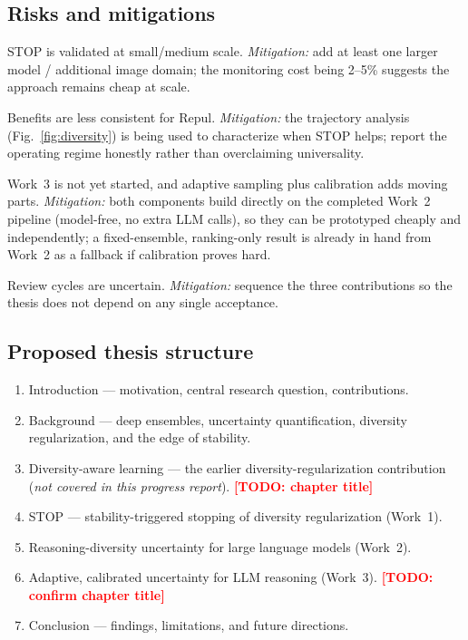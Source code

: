 \documentclass[11pt]{article}
\newcommand{\TODO}[1]{\textcolor{red}{\textbf{[TODO: #1]}}}
\begin{document}
\subsection{Risks and mitigations}
\begin{description}[leftmargin=2.4em, style=nextline, itemsep=3pt]
  \item[Scaling risk] STOP is validated at small/medium scale. \emph{Mitigation:} add at least one
  larger model / additional image domain; the monitoring cost being 2--5\% suggests the approach
  remains cheap at scale.
  \item[Regularizer-dependence risk] Benefits are less consistent for Repul. \emph{Mitigation:}
  the trajectory analysis (Fig.~\ref{fig:diversity}) is being used to characterize when STOP helps;
  report the operating regime honestly rather than overclaiming universality.
  \item[Work~3 feasibility] Work~3 is not yet started, and adaptive sampling plus calibration adds
  moving parts. \emph{Mitigation:} both components build directly on the completed Work~2 pipeline
  (model-free, no extra LLM calls), so they can be prototyped cheaply and independently; a
  fixed-ensemble, ranking-only result is already in hand from Work~2 as a fallback if calibration
  proves hard.
  \item[Publication timing] Review cycles are uncertain. \emph{Mitigation:} sequence the three
  contributions so the thesis does not depend on any single acceptance.
\end{description}

\subsection{Proposed thesis structure}
\begin{enumerate}[itemsep=1pt]
  \item Introduction --- motivation, central research question, contributions.
  \item Background --- deep ensembles, uncertainty quantification, diversity regularization, and
  the edge of stability.
  \item Diversity-aware learning --- the earlier diversity-regularization contribution
  (\emph{not covered in this progress report}). \TODO{chapter title}
  \item STOP --- stability-triggered stopping of diversity regularization (Work~1).
  \item Reasoning-diversity uncertainty for large language models (Work~2).
  \item Adaptive, calibrated uncertainty for LLM reasoning (Work~3). \TODO{confirm chapter title}
  \item Conclusion --- findings, limitations, and future directions.
\end{enumerate}
\end{document}
